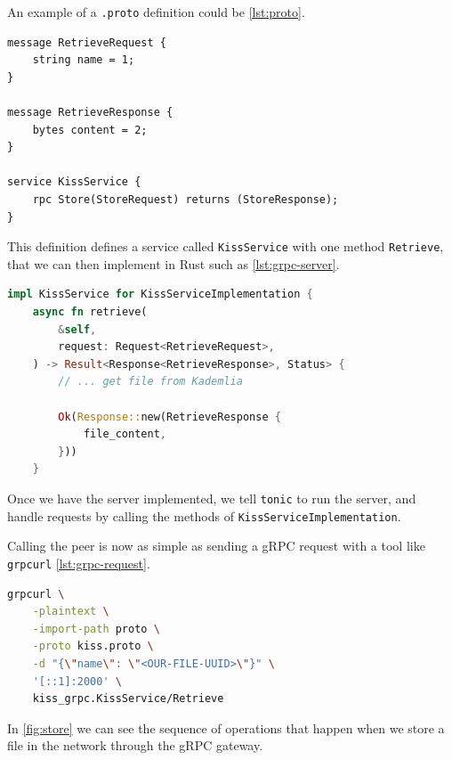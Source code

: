 An example of a \texttt{.proto} definition could be \autoref{lst:proto}.

\begin{lstlisting}[caption={Example of a .proto file}, label={lst:proto}]
message RetrieveRequest {
    string name = 1;
}

message RetrieveResponse {
    bytes content = 2;
}

service KissService {
    rpc Store(StoreRequest) returns (StoreResponse);
}
\end{lstlisting}

This definition defines a service called \texttt{KissService} with one method \texttt{Retrieve},
that we can then implement in Rust such as \autoref{lst:grpc-server}.

\begin{lstlisting}[caption={Example of a gRPC server implementation}, label={lst:grpc-server}, language=Rust, style=colouredRust]
impl KissService for KissServiceImplementation {
    async fn retrieve(
        &self,
        request: Request<RetrieveRequest>,
    ) -> Result<Response<RetrieveResponse>, Status> {
        // ... get file from Kademlia

        Ok(Response::new(RetrieveResponse {
            file_content,
        }))
    }

\end{lstlisting}

Once we have the server implemented, we tell \texttt{tonic} to run the server,
and handle requests by calling the methods of \texttt{KissServiceImplementation}.

Calling the peer is now as simple as sending a gRPC request with a tool like \texttt{grpcurl} \autoref{lst:grpc-request}.

\begin{lstlisting}[language=bash, caption={Example of a gRPC request}, label={lst:grpc-request}]
    grpcurl \
    -plaintext \
    -import-path proto \
    -proto kiss.proto \
    -d "{\"name\": \"<OUR-FILE-UUID>\"}" \
    '[::1]:2000' \
    kiss_grpc.KissService/Retrieve
\end{lstlisting}

In \autoref{fig:store} we can see the sequence of operations that happen
when we store a file in the network through the gRPC gateway.

